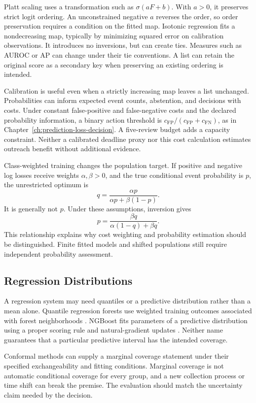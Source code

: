Platt scaling uses a transformation such as $\sigma(aF+b)$. With $a>0$, it preserves strict logit ordering. An unconstrained negative $a$ reverses the order, so order preservation requires a condition on the fitted map. Isotonic regression fits a nondecreasing map, typically by minimizing squared error on calibration observations. It introduces no inversions, but can create ties. Measures such as AUROC or AP can change under their tie conventions. A list can retain the original score as a secondary key when preserving an existing ordering is intended.

Calibration is useful even when a strictly increasing map leaves a list unchanged. Probabilities can inform expected event counts, abstention, and decisions with costs. Under constant false-positive and false-negative costs and the declared probability information, a binary action threshold is $c_{\mathrm{FP}}/(c_{\mathrm{FP}}+c_{\mathrm{FN}})$, as in Chapter~\ref{ch:prediction-loss-decision}. A five-review budget adds a capacity constraint. Neither a calibrated deadline proxy nor this cost calculation estimates outreach benefit without additional evidence.

Class-weighted training changes the population target. If positive and negative log losses receive weights $\alpha,\beta>0$, and the true conditional event probability is $p$, the unrestricted optimum is
\[
q=\frac{\alpha p}{\alpha p+\beta(1-p)}.
\]
It is generally not $p$. Under these assumptions, inversion gives
\[
p=\frac{\beta q}{\alpha(1-q)+\beta q}.
\]
This relationship explains why cost weighting and probability estimation should be distinguished. Finite fitted models and shifted populations still require independent probability assessment.

\subsection{Regression Distributions}

A regression system may need quantiles or a predictive distribution rather than a mean alone. Quantile regression forests use weighted training outcomes associated with forest neighborhoods \citep{meinshausen2006quantile}. NGBoost fits parameters of a predictive distribution using a proper scoring rule and natural-gradient updates \citep{duan2020ngboost}. Neither name guarantees that a particular predictive interval has the intended coverage.

Conformal methods can supply a marginal coverage statement under their specified exchangeability and fitting conditions. Marginal coverage is not automatic conditional coverage for every group, and a new collection process or time shift can break the premise. The evaluation should match the uncertainty claim needed by the decision.

